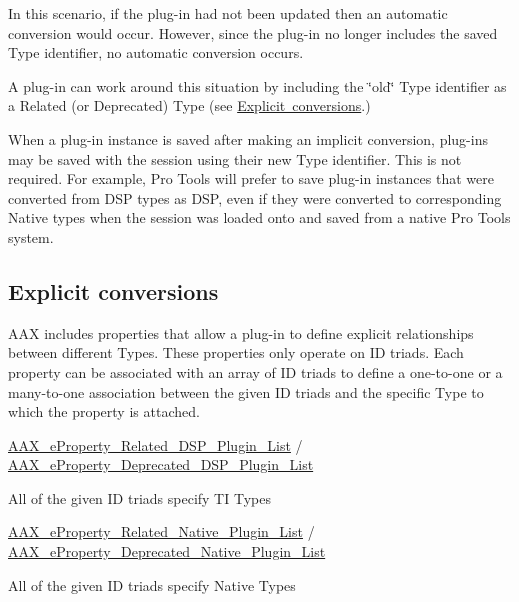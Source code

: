 In this scenario, if the plug-\/in had not been updated then an automatic conversion would occur. However, since the plug-\/in no longer includes the saved Type identifier, no automatic conversion occurs.

A plug-\/in can work around this situation by including the \char`\"{}old\char`\"{} Type identifier as a Related (or Deprecated) Type (see \mbox{\hyperlink{a00826_advancedTopics_relatedTypes_explicitconversions}{Explicit conversions}}.)

When a plug-\/in instance is saved after making an implicit conversion, plug-\/ins may be saved with the session using their new Type identifier. This is not required. For example, Pro Tools will prefer to save plug-\/in instances that were converted from D\+SP types as D\+SP, even if they were converted to corresponding Native types when the session was loaded onto and saved from a native Pro Tools system.\hypertarget{a00826_advancedTopics_relatedTypes_explicitconversions}{}\subsection{Explicit conversions}\label{a00826_advancedTopics_relatedTypes_explicitconversions}
A\+AX includes properties that allow a plug-\/in to define explicit relationships between different Types. These properties only operate on ID triads. Each property can be associated with an array of ID triads to define a one-\/to-\/one or a many-\/to-\/one association between the given ID triads and the specific Type to which the property is attached. 
\begin{DoxyItemize}
\item \mbox{\hyperlink{a00662_a13e384f22825afd3db6d68395b79ce0da9dc35184d705e963f14f85df4d71193d}{A\+A\+X\+\_\+e\+Property\+\_\+\+Related\+\_\+\+D\+S\+P\+\_\+\+Plugin\+\_\+\+List}} / \mbox{\hyperlink{a00662_a13e384f22825afd3db6d68395b79ce0dab102bc794f2770c14b1f0fe2dde6766a}{A\+A\+X\+\_\+e\+Property\+\_\+\+Deprecated\+\_\+\+D\+S\+P\+\_\+\+Plugin\+\_\+\+List}} 
\begin{DoxyItemize}
\item All of the given ID triads specify TI Types  
\end{DoxyItemize}
\item \mbox{\hyperlink{a00662_a13e384f22825afd3db6d68395b79ce0dae47f50370ae2f6bf29b8cacc6a41d924}{A\+A\+X\+\_\+e\+Property\+\_\+\+Related\+\_\+\+Native\+\_\+\+Plugin\+\_\+\+List}} / \mbox{\hyperlink{a00662_a13e384f22825afd3db6d68395b79ce0da3f1e690c987d601001a7cc1da8247399}{A\+A\+X\+\_\+e\+Property\+\_\+\+Deprecated\+\_\+\+Native\+\_\+\+Plugin\+\_\+\+List}} 
\begin{DoxyItemize}
\item All of the given ID triads specify Native Types  
\end{DoxyItemize}
\end{DoxyItemize}

